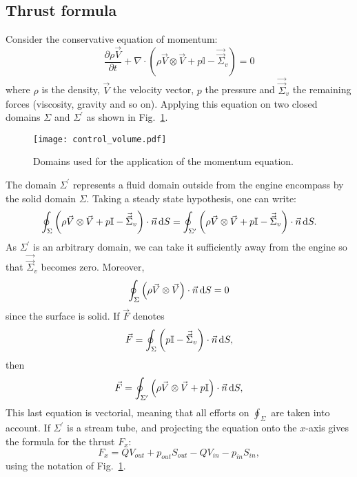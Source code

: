 
\subsection{Thrust formula}
\label{sub:cror_thrust}

Consider the conservative equation of momentum:
\begin{equation}
	\frac{\partial \rho \vec{V}}{\partial t} 
	+ \nabla \cdot (\rho \vec{V} \otimes \vec{V} + p \mathbb{I} - \vec{\vec{\Sigma}}_v) = 0
\end{equation}
where $\rho$ is the density, $\vec{V}$ the velocity vector, $p$ the pressure and
$\vec{\vec{\Sigma}}_v$ the remaining forces (viscosity, gravity and so on).
Applying this equation on two closed domains $\Sigma$ and $\Sigma^\prime$ as
shown in Fig.~\ref{fig:cror_control_volume}.
\begin{figure}[htb]
  \centering
  \texttt{[image: control\_volume.pdf]}
  \caption{Domains used for the application of the momentum equation.}
  \label{fig:cror_control_volume}
\end{figure}
The domain $\Sigma^\prime$ represents a fluid domain outside from the
engine encompass by the solid domain $\Sigma$.
Taking a steady state hypothesis, one can write:
\begin{equation}
	\oint_{\Sigma} \left(\rho \vec{V} \otimes \vec{V} + 
	                       p \mathbb{I} - 
	                       \vec{\vec{\Sigma}}_v \right) \cdot \vec{n} \mathop{}\!\mathrm{d} S
    =
   	\oint_{\Sigma^\prime} \left(\rho \vec{V} \otimes \vec{V} + 
	                       p \mathbb{I} - 
	                       \vec{\vec{\Sigma}}_v \right) \cdot \vec{n} \mathop{}\!\mathrm{d} S.
\end{equation} 
As $\Sigma^\prime$ is an arbitrary domain, we can take it sufficiently
away from the engine so that $\vec{\vec{\Sigma}}_v$ becomes zero.
Moreover, 
\begin{equation}
	\oint_{\Sigma} \left(\rho \vec{V} \otimes \vec{V} \right) \cdot \vec{n} \mathop{}\!\mathrm{d} S = 0
\end{equation}
since the surface is solid. If $\vec{F}$ denotes
\begin{equation}
	\vec{F} = \oint_{\Sigma} \left(p \mathbb{I} - 
	\vec{\vec{\Sigma}}_v \right) \cdot \vec{n} \mathop{}\!\mathrm{d} S,
\end{equation}
then
\begin{equation}
	\vec{F} = \oint_{\Sigma^\prime} \left(\rho \vec{V} \otimes \vec{V} +
	p \mathbb{I} \right) \cdot \vec{n} \mathop{}\!\mathrm{d} S,
\end{equation}
This last equation is vectorial, meaning that all efforts on 
$\oint_{\Sigma}$ are taken into account.
If $\Sigma^\prime$ is a stream tube, and projecting the equation
onto the $x$-axis gives the formula for the thrust $F_x$:
\begin{equation}
	F_x = Q V_{out} + p_{out} S_{out}
	- Q V_{in} - p_{in} S_{in},
\end{equation}
using the notation of Fig.~\ref{fig:cror_control_volume}.

